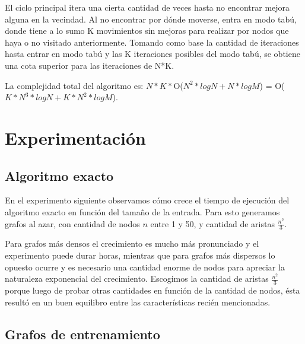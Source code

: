 \documentclass[a4paper, 10pt, twoside]{article}
\begin{document}
El ciclo principal itera una cierta cantidad de veces hasta no encontrar mejora alguna en la vecindad. Al no encontrar por dónde moverse, entra en modo tabú, donde tiene a lo sumo K movimientos sin mejoras para realizar por nodos que haya o no visitado anteriormente. Tomando como base la cantidad de iteraciones hasta entrar en modo tabú y las K iteraciones posibles del modo tabú, se obtiene una cota superior para las iteraciones de N*K.

La complejidad total del algoritmo es: $N*K*$O($N^2 * log N + N * log M$) = O($K*N^3 * log N + K*N^2 * log M$).




\newpage


\section{Experimentación}


\subsection{Algoritmo exacto}

En el experimento siguiente observamos cómo crece el tiempo de ejecución del algoritmo exacto en función del tamaño de la entrada. Para esto generamos grafos al azar, con cantidad de nodos $n$ entre 1 y 50, y cantidad de aristas $\frac{n^2}{3}$.

\begin{figure}[H]
	
\end{figure}

Para grafos más densos el crecimiento es mucho más pronunciado y el experimento puede durar horas, mientras que para grafos más	dispersos lo opuesto ocurre y es necesario una cantidad enorme de nodos para apreciar la naturaleza exponencial del crecimiento. Escogimos la cantidad de aristas $\frac{n^2}{3}$ porque luego de probar otras cantidades en función de la cantidad de nodos, ésta resultó en un buen equilibro entre las características recién mencionadas.


\subsection{Grafos de entrenamiento}
\end{document}
